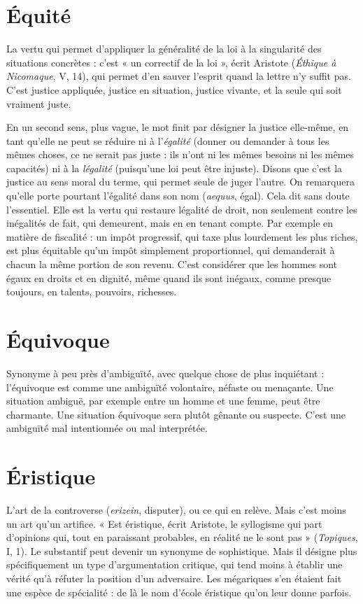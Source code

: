 \section{Équité}
La vertu qui permet d’appliquer la généralité de la loi à la singularité
des situations concrètes : c’est « un correctif de la loi », écrit
Aristote ({\it Éthique à Nicomaque}, V, 14), qui permet d’en sauver l'esprit quand la
lettre n’y suffit pas. C’est justice appliquée, justice en situation, justice vivante,
et la seule qui soit vraiment juste.

En un second sens, plus vague, le mot finit par désigner la justice elle-même,
en tant qu'elle ne peut se réduire ni à l'{\it égalité} (donner ou demander à
tous les mêmes choses, ce ne serait pas juste : ils n’ont ni les mêmes besoins ni
les mêmes capacités) ni à la {\it légalité} (puisqu’une loi peut être injuste). Disons
que c’est la justice au sens moral du terme, qui permet seule de juger l’autre.
On remarquera qu’elle porte pourtant l'égalité dans son nom ({\it aequus}, égal).
Cela dit sans doute l'essentiel. Elle est la vertu qui restaure légalité de droit,
non seulement contre les inégalités de fait, qui demeurent, mais en en tenant
compte. Par exemple en matière de fiscalité : un impôt progressif, qui taxe plus
lourdement les plus riches, est plus équitable qu’un impôt simplement proportionnel,
qui demanderait à chacun la même portion de son revenu. C’est considérer
que les hommes sont égaux en droits et en dignité, même quand ils sont
inégaux, comme presque toujours, en talents, pouvoirs, richesses.

\section{Équivoque}
Synonyme à peu près d’ambiguïté, avec quelque chose de
plus inquiétant : l’équivoque est comme une ambiguïté
volontaire, néfaste ou menaçante. Une situation ambiguë, par exemple entre
un homme et une femme, peut être charmante. Une situation équivoque sera
plutôt gênante ou suspecte. C’est une ambiguïté mal intentionnée ou mal
interprétée.

\section{Éristique}
L’art de la controverse ({\it erizein}, disputer), ou ce qui en relève.
Mais c'est moins un art qu’un artifice. « Est éristique, écrit
Aristote, le syllogisme qui part d'opinions qui, tout en paraissant probables, en
réalité ne le sont pas » ({\it Topiques}, I, 1). Le substantif peut devenir un synonyme
de sophistique. Mais il désigne plus spécifiquement un type d’argumentation
critique, qui tend moins à établir une vérité qu’à réfuter la position d’un adversaire.
Les mégariques s’en étaient fait une espèce de spécialité : de là le nom
d’école éristique qu’on leur donne parfois.

